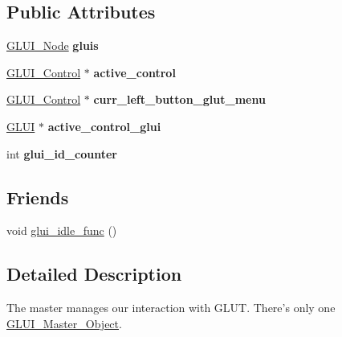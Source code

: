 \subsection*{Public Attributes}
\begin{DoxyCompactItemize}
\item 
\hypertarget{class_g_l_u_i___master___object_adef972538b4195478dd9feaabd55bd26}{\hyperlink{class_g_l_u_i___node}{G\+L\+U\+I\+\_\+\+Node} {\bfseries gluis}}\label{class_g_l_u_i___master___object_adef972538b4195478dd9feaabd55bd26}

\item 
\hypertarget{class_g_l_u_i___master___object_a024c89d0bbae3ea4ebf84af79b093a36}{\hyperlink{class_g_l_u_i___control}{G\+L\+U\+I\+\_\+\+Control} $\ast$ {\bfseries active\+\_\+control}}\label{class_g_l_u_i___master___object_a024c89d0bbae3ea4ebf84af79b093a36}

\item 
\hypertarget{class_g_l_u_i___master___object_a0df5b34fced5bb930fb0fe4d982b4e8c}{\hyperlink{class_g_l_u_i___control}{G\+L\+U\+I\+\_\+\+Control} $\ast$ {\bfseries curr\+\_\+left\+\_\+button\+\_\+glut\+\_\+menu}}\label{class_g_l_u_i___master___object_a0df5b34fced5bb930fb0fe4d982b4e8c}

\item 
\hypertarget{class_g_l_u_i___master___object_a41b447c76e0a9088aa703593499ff4cb}{\hyperlink{class_g_l_u_i}{G\+L\+U\+I} $\ast$ {\bfseries active\+\_\+control\+\_\+glui}}\label{class_g_l_u_i___master___object_a41b447c76e0a9088aa703593499ff4cb}

\item 
\hypertarget{class_g_l_u_i___master___object_a9cd3c12203f03cd54115e7852e0d82e3}{int {\bfseries glui\+\_\+id\+\_\+counter}}\label{class_g_l_u_i___master___object_a9cd3c12203f03cd54115e7852e0d82e3}

\end{DoxyCompactItemize}
\subsection*{Friends}
\begin{DoxyCompactItemize}
\item 
void \hyperlink{class_g_l_u_i___master___object_ad7c67b26e8436e7ef84d8657704010da}{glui\+\_\+idle\+\_\+func} ()
\end{DoxyCompactItemize}


\subsection{Detailed Description}
The master manages our interaction with G\+L\+U\+T. There's only one \hyperlink{class_g_l_u_i___master___object}{G\+L\+U\+I\+\_\+\+Master\+\_\+\+Object}. 

